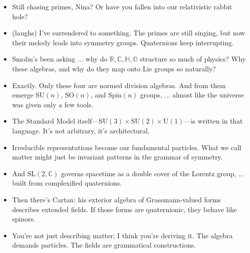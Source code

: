 \begin{itemize}
  \item[\textbf{Ernest:}] Still chasing primes, Nina? Or have you fallen into our relativistic rabbit hole?

  \item[\textbf{Nina:}] (laughs) I've surrendered to something. The primes are still singing, but now their melody leads into symmetry groups. Quaternions keep interrupting.

  \item[\textbf{Ernest:}] Smolin’s been asking ... why do \(\mathbb{R}, \mathbb{C}, \mathbb{H}, \mathbb{O}\) structure so much of physics? Why these algebras, and why do they map onto Lie groups so naturally?

  \item[\textbf{Nina:}] Exactly. Only these four are normed division algebras. And from them emerge \(\mathrm{SU}(n)\), \(\mathrm{SO}(n)\), and \(\mathrm{Spin}(n)\) groups, ... almost like the universe was given only a few tools.

  \item[\textbf{Ernest:}] The Standard Model itself—\(\mathrm{SU}(3) \times \mathrm{SU}(2) \times \mathrm{U}(1)\)—is written in that language. It’s not arbitrary, it’s architectural.

  \item[\textbf{Nina:}] Irreducible representations become our fundamental particles. What we call matter might just be invariant patterns in the grammar of symmetry.

  \item[\textbf{Ernest:}] And \(\mathrm{SL}(2,\mathbb{C})\) governs spacetime as a double cover of the Lorentz group, ... built from complexified quaternions.

  \item[\textbf{Nina:}] Then there’s Cartan: his exterior algebra of Grassmann-valued forms describes extended fields. If those forms are quaternionic, they behave like spinors.

  \item[\textbf{Ernest:}] You’re not just describing matter; I think you’re deriving it. The algebra demands particles. The fields are grammatical constructions.


\end{itemize}
